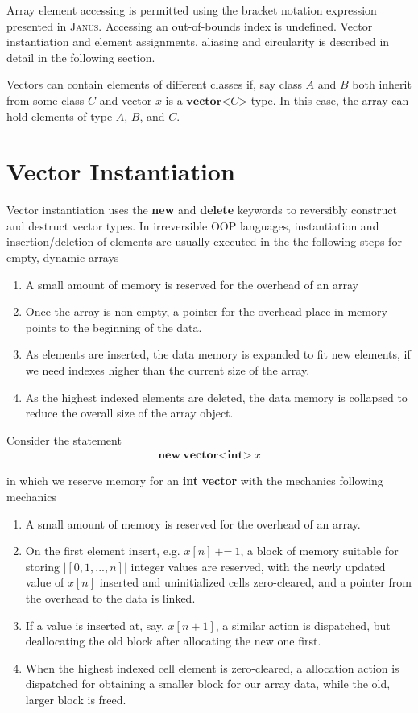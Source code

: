 Array element accessing is permitted using the bracket notation expression presented in \textsc{Janus}. Accessing an out-of-bounds index is undefined.
Vector instantiation and element assignments, aliasing and circularity is described in detail in the following section.

Vectors can contain elements of different classes if, say class $A$ and $B$ both inherit from some class $C$ and vector $x$ is a $\textbf{vector}\texttt{<}C\texttt{>}$ type. In this case, the array can hold elements of type $A$, $B$, and $C$.

\section{Vector Instantiation}
\label{sec:vector-instatiation}
Vector instantiation uses the \textbf{new} and \textbf{delete} keywords to reversibly construct and destruct vector types. In irreversible OOP languages,  instantiation and insertion/deletion of elements are usually executed in the the following steps for empty, dynamic arrays

\begin{enumerate}
    \item A small amount of memory is reserved for the overhead of an array
    \item Once the array is non-empty, a pointer for the overhead place in memory points to the beginning of the data.
    \item As elements are inserted, the data memory is expanded to fit new elements, if we need indexes higher than the current size of the array.
    \item As the highest indexed elements are deleted, the data memory is collapsed to reduce the overall size of the array object.
\end{enumerate}

Consider the statement
\begin{align*}
\textbf{new}\ \textbf{vector}\texttt{<}\textbf{int}\texttt{>}\ x
\end{align*} 

in which we reserve memory for an \textbf{int} \textbf{vector} with the mechanics following mechanics

\begin{enumerate}
    \item A small amount of memory is reserved for the overhead of an array.
    \item On the first element insert, e.g. $x[n]\ \texttt{+=}\ 1$, a block of memory suitable for storing $|[0, 1, ..., n]|$ integer values are reserved, with the newly updated value of $x[n]$ inserted and uninitialized cells zero-cleared, and a pointer from the overhead to the data is linked.
    \item If a value is inserted at, say, $x[n+1]$, a similar action is dispatched, but deallocating the old block after allocating the new one first.
    \item When the highest indexed cell element is zero-cleared, a allocation action is dispatched for obtaining a smaller block for our array data, while the old, larger block is freed.
\end{enumerate}

